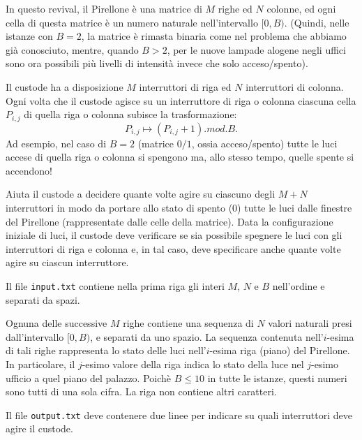 \renewcommand{\nomebreve}{pirelloneGFB}
\renewcommand{\titolo}{Luci della Ribalta al Pirellone}

\introduzione{}

In questo revival, il Pirellone è una matrice di $M$ righe ed $N$ colonne,
ed ogni cella di questa matrice è un numero naturale nell'intervallo $[0,B)$.
(Quindi, nelle istanze con $B=2$, la matrice è rimasta binaria come nel problema che abbiamo già conosciuto, mentre, quando $B>2$,
per le nuove lampade alogene negli uffici sono ora possibili più livelli di intensità invece che solo acceso/spento).
  
Il custode ha a disposizione $M$ interruttori di riga ed $N$
interruttori di colonna.  Ogni volta che il custode agisce
su un interruttore di riga o colonna ciascuna cella $P_{i,j}$ di quella riga o colonna subisce la trasformazione:
\[
   P_{i,j} \mapsto (P_{i,j}+1) .mod. B.
\]
Ad esempio, nel caso di $B=2$ (matrice $0/1$, ossia acceso/spento)
tutte le luci accese di quella riga o colonna si spengono ma, allo stesso tempo, quelle spente si accendono!

Aiuta il custode a decidere quante volte agire su ciascuno degli $M+N$
interruttori in modo da portare allo stato di spento ($0$) tutte le luci dalle finestre del Pirellone (rappresentate dalle celle della matrice). Data la configurazione iniziale di luci, il custode
deve verificare se sia possibile spegnere le luci con gli interruttori
di riga e colonna e, in tal caso, deve specificare anche quante volte agire su ciascun interruttore.


  
Il file \verb'input.txt' contiene nella prima riga gli interi
$M$, $N$ e $B$ nell'ordine e separati da spazi.

Ognuna delle successive $M$ righe contiene una sequenza di $N$ valori naturali presi dall'intervallo $[0,B)$, e separati da uno spazio.
La sequenza contenuta nell'$i$-esima di tali righe rappresenta lo stato
delle luci nell'$i$-esima riga (piano) del Pirellone. In
particolare, il $j$-esimo valore della riga indica lo stato della luce nel $j$-esimo ufficio a quel piano del palazzo.
  Poichè $B \leq 10$ in tutte le istanze, questi numeri sono tutti di una sola cifra. La riga non contiene altri caratteri.



  
Il file \verb'output.txt' deve contenere due linee per indicare
su quali interruttori deve agire il custode.

